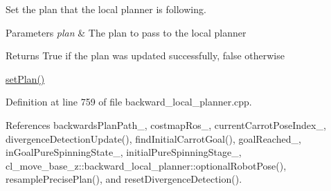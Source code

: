 Set the plan that the local planner is following. 


\begin{DoxyParams}{Parameters}
{\em plan} & The plan to pass to the local planner \\
\hline
\end{DoxyParams}
\begin{DoxyReturn}{Returns}
True if the plan was updated successfully, false otherwise
\end{DoxyReturn}
\hyperlink{classcl__move__base__z_1_1backward__local__planner_1_1BackwardLocalPlanner_ab11a0eec45f24b5a5a3987a50427eed4}{set\+Plan()} 

Definition at line 759 of file backward\+\_\+local\+\_\+planner.\+cpp.



References backwards\+Plan\+Path\+\_\+, costmap\+Ros\+\_\+, current\+Carrot\+Pose\+Index\+\_\+, divergence\+Detection\+Update(), find\+Initial\+Carrot\+Goal(), goal\+Reached\+\_\+, in\+Goal\+Pure\+Spinning\+State\+\_\+, initial\+Pure\+Spinning\+Stage\+\_\+, cl\+\_\+move\+\_\+base\+\_\+z\+::backward\+\_\+local\+\_\+planner\+::optional\+Robot\+Pose(), resample\+Precise\+Plan(), and reset\+Divergence\+Detection().


